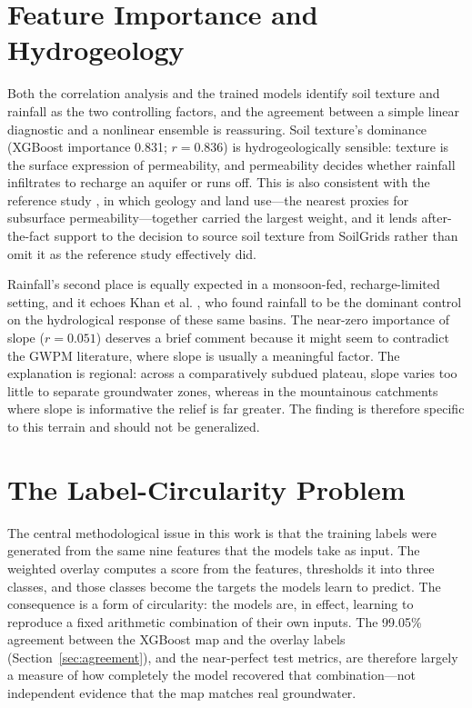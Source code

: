 \section{Feature Importance and Hydrogeology}
\label{sec:discuss_features}

Both the correlation analysis and the trained models identify soil texture and
rainfall as the two controlling factors, and the agreement between a simple linear
diagnostic and a nonlinear ensemble is reassuring. Soil texture's dominance
(XGBoost importance 0.831; $r = 0.836$) is hydrogeologically sensible: texture is
the surface expression of permeability, and permeability decides whether rainfall
infiltrates to recharge an aquifer or runs off. This is also consistent with the
reference study \cite{waqas2022chakwal}, in which geology and land use---the
nearest proxies for subsurface permeability---together carried the largest weight,
and it lends after-the-fact support to the decision to source soil texture from
SoilGrids \cite{poggio2021soilgrids} rather than omit it as the reference study
effectively did.

Rainfall's second place is equally expected in a monsoon-fed, recharge-limited
setting, and it echoes Khan et al. \cite{khan2023rainfallrunoff}, who found
rainfall to be the dominant control on the hydrological response of these same
basins. The near-zero importance of slope ($r = 0.051$) deserves a brief comment
because it might seem to contradict the GWPM literature, where slope is usually a
meaningful factor. The explanation is regional: across a comparatively subdued
plateau, slope varies too little to separate groundwater zones, whereas in the
mountainous catchments where slope is informative the relief is far greater. The
finding is therefore specific to this terrain and should not be generalized.

\section{The Label-Circularity Problem}
\label{sec:discuss_circularity}

The central methodological issue in this work is that the training labels were
generated from the same nine features that the models take as input. The
weighted overlay computes a score from the features, thresholds it into three
classes, and those classes become the targets the models learn to predict. The
consequence is a form of circularity: the models are, in effect, learning to
reproduce a fixed arithmetic combination of their own inputs. The 99.05\%
agreement between the XGBoost map and the overlay labels
(Section~\ref{sec:agreement}), and the near-perfect test metrics, are therefore
largely a measure of how completely the model recovered that combination---not
independent evidence that the map matches real groundwater.

